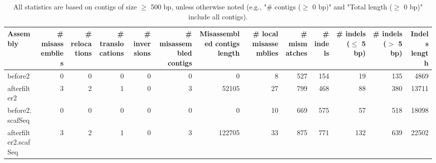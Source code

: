 \documentclass[12pt,a4paper]{article}
\begin{document}
\begin{table}[ht]
\begin{center}
\caption{All statistics are based on contigs of size $\geq$ 500 bp, unless otherwise noted (e.g., "\# contigs ($\geq$ 0 bp)" and "Total length ($\geq$ 0 bp)" include all contigs).}
\begin{tabular}{|l*{12}{|r}|}
\hline
Assembly & \# misassemblies &     \# relocations &     \# translocations &     \# inversions & \# misassembled contigs & Misassembled contigs length & \# local misassemblies & \# mismatches & \# indels &     \# indels ($\leq$ 5 bp) &     \# indels ($>$ 5 bp) & Indels length \\ \hline
before2 & 0 & 0 & 0 & 0 & 0 & 0 & 8 & 527 & 154 & 19 & 135 & 4869 \\ \hline
afterfilter2 & 3 & 2 & 1 & 0 & 3 & 52105 & 27 & 799 & 468 & 88 & 380 & 13711 \\ \hline
before2.scafSeq & 0 & 0 & 0 & 0 & 0 & 0 & 10 & 669 & 575 & 57 & 518 & 18098 \\ \hline
afterfilter2.scafSeq & 3 & 2 & 1 & 0 & 3 & 122705 & 33 & 875 & 771 & 132 & 639 & 22502 \\ \hline
\end{tabular}
\end{center}
\end{table}
\end{document}
